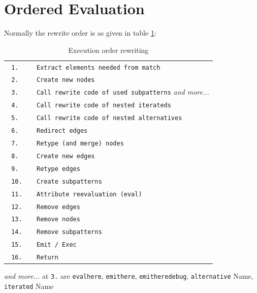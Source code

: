 \section{Ordered Evaluation} \label{sec:localvarorderedevalyield}

Normally the rewrite order is as given in table \ref{table:executionorderrewriting}:
\begin{table}[htbp]
  \centering
  \begin{tabularx}{\linewidth}{|l|X|} \hline
    \texttt{ 1. } & \texttt{ Extract elements needed from match } \\
    \texttt{ 2. } & \texttt{ Create new nodes } \\
    \texttt{ 3. } & \texttt{ Call rewrite code of used subpatterns} \emph{and more...} \\ 
	  \texttt{ 4. } & \texttt{ Call rewrite code of nested iterateds } \\
    \texttt{ 5. } & \texttt{ Call rewrite code of nested alternatives } \\
    \texttt{ 6. } & \texttt{ Redirect edges } \\  
    \texttt{ 7. } & \texttt{ Retype (and merge) nodes } \\  
    \texttt{ 8. } & \texttt{ Create new edges } \\
    \texttt{ 9. } & \texttt{ Retype edges } \\  
    \texttt{ 10. } & \texttt{ Create subpatterns } \\
    \texttt{ 11. } & \texttt{ Attribute reevaluation (eval) } \\
    \texttt{ 12. } & \texttt{ Remove edges } \\ 
	  \texttt{ 13. } & \texttt{ Remove nodes } \\
    \texttt{ 14. } & \texttt{ Remove subpatterns } \\
    \texttt{ 15. } & \texttt{ Emit / Exec } \\  
    \texttt{ 16. } & \texttt{ Return } \\ \hline
	\end{tabularx}
	{\small \emph{and more...} at \texttt{3.} are \texttt{evalhere}, \texttt{emithere}, \texttt{emitheredebug}, \texttt{alternative} Name, \texttt{iterated} Name}
  \caption{Execution order rewriting}
  \label{table:executionorderrewriting}
\end{table}

